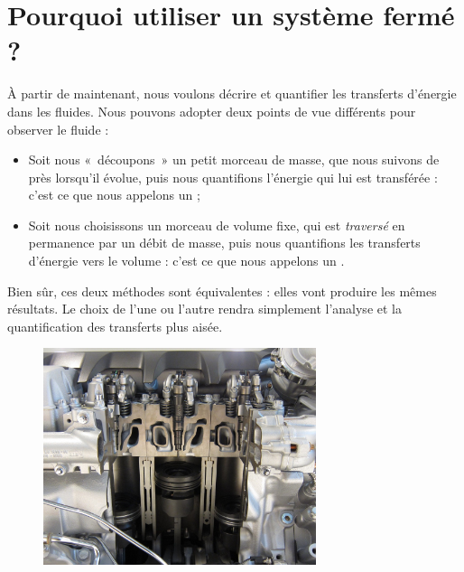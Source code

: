\section{Pourquoi utiliser un système fermé ?}

		À partir de maintenant, nous voulons décrire et quantifier les transferts d’énergie dans les fluides. Nous pouvons adopter deux points de vue différents pour observer le fluide :
		\begin{itemize}
			\item Soit nous «~découpons~» un petit morceau de masse, que nous suivons de près lorsqu’il évolue, puis nous quantifions l’énergie qui lui est transférée : c’est ce que nous appelons un  ;
			\item Soit nous choisissons un morceau de volume fixe, qui est \emph{traversé} en permanence par un débit de masse, puis nous quantifions les transferts d’énergie vers le volume : c’est ce que nous appelons un .
		\end{itemize}
		
		Bien sûr, ces deux méthodes sont équivalentes : elles vont produire les mêmes résultats. Le choix de l’une ou l’autre rendra simplement l’analyse et la quantification des transferts plus aisée.

		\begin{figure}
			\begin{center}
			\includegraphics[width=8cm]{images/diesel_engine_cutaway.jpg}
			\end{center}
				{ \ccbysa \olivier}
				\label{fig_diesel_engine_cutaway}
		\end{figure}
		
